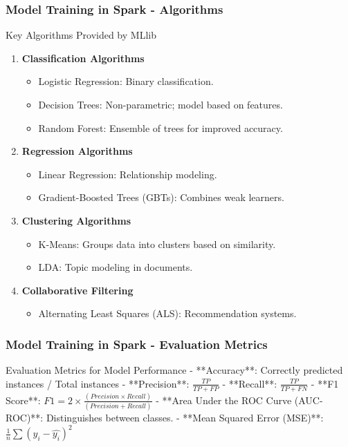 \documentclass[aspectratio=169]{beamer}
\begin{document}
\begin{frame}[fragile]
    \frametitle{Model Training in Spark - Algorithms}
    \begin{block}{Key Algorithms Provided by MLlib}
        \begin{enumerate}
            \item \textbf{Classification Algorithms}
                \begin{itemize}
                    \item Logistic Regression: Binary classification.
                    \item Decision Trees: Non-parametric; model based on features.
                    \item Random Forest: Ensemble of trees for improved accuracy.
                \end{itemize}
            \item \textbf{Regression Algorithms}
                \begin{itemize}
                    \item Linear Regression: Relationship modeling.
                    \item Gradient-Boosted Trees (GBTs): Combines weak learners.
                \end{itemize}
            \item \textbf{Clustering Algorithms}
                \begin{itemize}
                    \item K-Means: Groups data into clusters based on similarity.
                    \item LDA: Topic modeling in documents.
                \end{itemize}
            \item \textbf{Collaborative Filtering}
                \begin{itemize}
                    \item Alternating Least Squares (ALS): Recommendation systems.
                \end{itemize}
        \end{enumerate}
    \end{block}
\end{frame}

\begin{frame}[fragile]
    \frametitle{Model Training in Spark - Evaluation Metrics}
    \begin{block}{Evaluation Metrics for Model Performance}
        - **Accuracy**: Correctly predicted instances / Total instances
        - **Precision**: \(\frac{TP}{TP + FP}\)
        - **Recall**: \(\frac{TP}{TP + FN}\)
        - **F1 Score**: \(F1 = 2 \times \frac{(Precision \times Recall)}{(Precision + Recall)}\)
        - **Area Under the ROC Curve (AUC-ROC)**: Distinguishes between classes.
        - **Mean Squared Error (MSE)**: \(\frac{1}{n} \sum (y_i - \hat{y_i})^2\)
    \end{block}
\end{frame}
\end{document}
